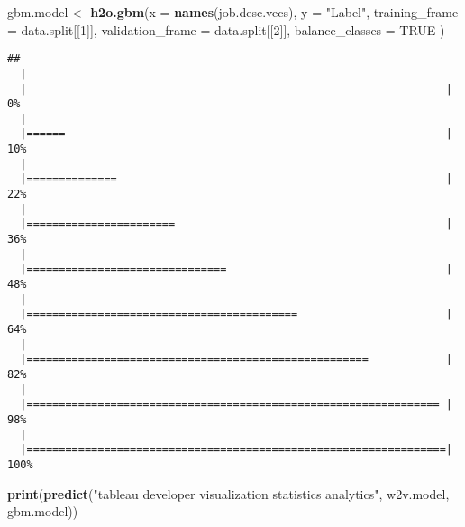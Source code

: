 \documentclass[]{article}
\newenvironment{Shaded}{\begin{snugshade}}{\end{snugshade}}
\newcommand{\KeywordTok}[1]{\textcolor[rgb]{0.13,0.29,0.53}{\textbf{{#1}}}}
\newcommand{\DataTypeTok}[1]{\textcolor[rgb]{0.13,0.29,0.53}{{#1}}}
\newcommand{\DecValTok}[1]{\textcolor[rgb]{0.00,0.00,0.81}{{#1}}}
\newcommand{\StringTok}[1]{\textcolor[rgb]{0.31,0.60,0.02}{{#1}}}
\newcommand{\OtherTok}[1]{\textcolor[rgb]{0.56,0.35,0.01}{{#1}}}
\newcommand{\NormalTok}[1]{{#1}}
\begin{document}
\begin{Shaded}
\begin{Highlighting}[]
\NormalTok{gbm.model <-}\StringTok{ }\KeywordTok{h2o.gbm}\NormalTok{(}\DataTypeTok{x =} \KeywordTok{names}\NormalTok{(job.desc.vecs),}
                     \DataTypeTok{y =} \StringTok{"Label"}\NormalTok{,}
                     \DataTypeTok{training_frame =} \NormalTok{data.split[[}\DecValTok{1}\NormalTok{]],}
                     \DataTypeTok{validation_frame =} \NormalTok{data.split[[}\DecValTok{2}\NormalTok{]], }
                     \DataTypeTok{balance_classes =} \OtherTok{TRUE}
                     \NormalTok{)}
\end{Highlighting}
\end{Shaded}

\begin{verbatim}
## 
  |                                                                       
  |                                                                 |   0%
  |                                                                       
  |======                                                           |  10%
  |                                                                       
  |==============                                                   |  22%
  |                                                                       
  |=======================                                          |  36%
  |                                                                       
  |===============================                                  |  48%
  |                                                                       
  |==========================================                       |  64%
  |                                                                       
  |=====================================================            |  82%
  |                                                                       
  |================================================================ |  98%
  |                                                                       
  |=================================================================| 100%
\end{verbatim}

\begin{Shaded}
\begin{Highlighting}[]
\KeywordTok{print}\NormalTok{(}\KeywordTok{predict}\NormalTok{(}\StringTok{"tableau developer visualization statistics analytics"}\NormalTok{, w2v.model, gbm.model))}
\end{Highlighting}
\end{Shaded}
\end{document}
